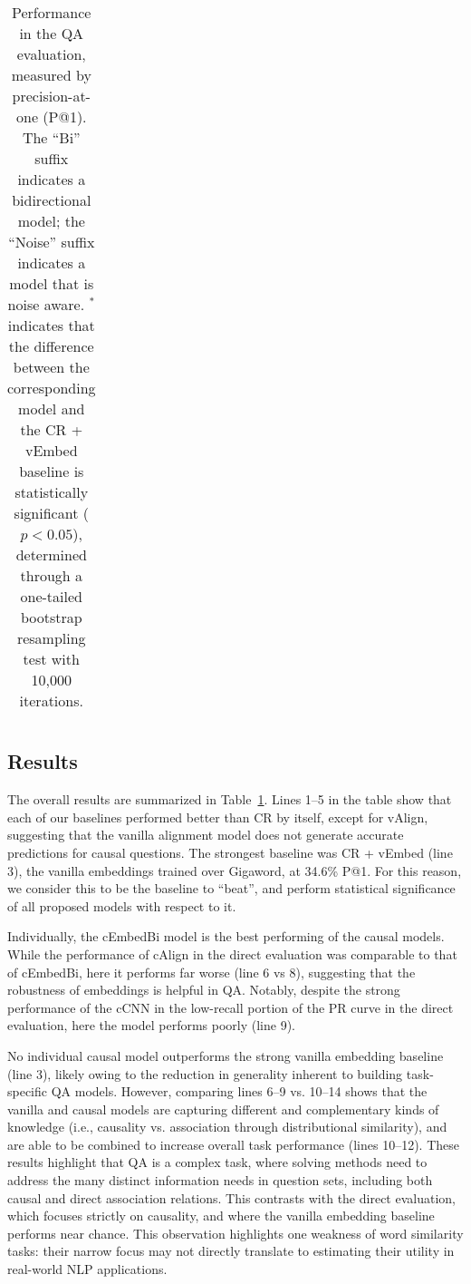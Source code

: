 \begin{table}[t!]
\begin{center}
\begin{footnotesize}
\begin{tabular}{lll}
\end{tabular}
\end{footnotesize}
\caption{{\footnotesize Performance in the QA evaluation, measured by precision-at-one (P@1).  The ``Bi'' suffix indicates a bidirectional model; the ``Noise'' suffix indicates a model that is noise aware. $^*$  indicates that the difference between the corresponding model and the CR + vEmbed baseline is statistically significant ($p < 0.05$), %
determined through a one-tailed bootstrap resampling test with 10,000 iterations. }} 
\label{tab:QA}
\end{center}
\end{table}

\subsection{Results}
The overall results are summarized in Table~\ref{tab:QA}.
Lines 1--5 in the table show that each of our baselines performed better than CR by itself, except for vAlign, suggesting that the vanilla alignment model does not generate accurate predictions for causal questions.
The strongest baseline was CR + vEmbed (line 3), the vanilla embeddings trained over Gigaword, at 34.6\% P@1. For this reason, we consider this to be the baseline to ``beat'', and perform statistical significance of all proposed models with respect to it. 

Individually, the cEmbedBi model is the best performing of the causal models.  While the performance of cAlign in the direct evaluation was comparable to that of cEmbedBi, here it performs far worse (line 6 vs 8), suggesting that the robustness of embeddings is helpful in QA.  Notably, despite the strong performance of the cCNN in the low-recall portion of the PR curve in the direct evaluation, here the model performs poorly (line 9).

No individual causal model outperforms the strong vanilla embedding baseline (line 3), likely owing to the reduction in generality inherent to building task-specific QA models.
However, comparing lines 6--9 vs. 10--14 shows that the vanilla and causal models are capturing different and complementary kinds of knowledge (i.e., causality vs. association through distributional similarity), and are able to be combined to increase overall task performance (lines 10--12).  These results highlight that QA is a complex task, where solving methods need to address the many distinct information needs in question sets, including both causal and direct association relations.  This contrasts with the direct evaluation, which focuses strictly on causality, and where the vanilla embedding baseline performs near chance. This observation highlights one weakness of word similarity tasks: their narrow focus may not directly translate to estimating their utility in real-world NLP applications. %

